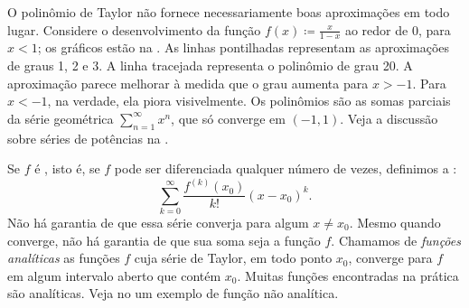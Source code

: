 O polinômio de Taylor não fornece necessariamente boas aproximações em todo lugar. Considere o desenvolvimento da função $f(x) \coloneqq \frac{x}{1-x}$ ao redor de $0$, para $x<1$; os gráficos estão na . As linhas pontilhadas representam as aproximações de graus 1, 2 e 3. A linha tracejada representa o polinômio de grau 20. A aproximação parece melhorar à medida que o grau aumenta para $x>-1$. Para $x<-1$, na verdade, ela piora visivelmente. Os polinômios são as somas parciais da série geométrica $\sum_{n=1}^\infty x^n$, que só converge em $(-1,1)$. Veja a discussão sobre séries de potências na .

\begin{myfigureht}
\caption{A função $\frac{x}{1-x}$ e os polinômios de Taylor $P_1^0$, $P_2^0$ e $P_3^0$ (pontilhados) e $P_{20}^0$ (tracejado).\label{fig:taylorgeom}}
\end{myfigureht}

Se $f$ é \emph{}, isto é, se $f$ pode ser diferenciada qualquer número de vezes, definimos a \emph{}:
\begin{equation*}
\sum_{k=0}^\infty
\frac{f^{(k)}(x_0)}{k!}{(x-x_0)}^k .
\end{equation*}
Não há garantia de que essa série converja para algum $x \neq x_0$. Mesmo quando converge, não há garantia de que sua soma seja a função $f$. Chamamos de \emph{funções analíticas} as funções $f$ cuja série de Taylor, em todo ponto $x_0$, converge para $f$ em algum intervalo aberto que contém $x_0$. Muitas funções encontradas na prática são analíticas. Veja no  um exemplo de função não analítica.

